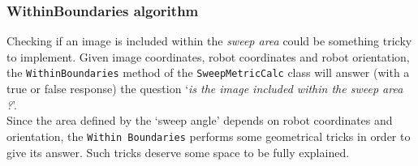 \subsubsection{WithinBoundaries algorithm}
\label{concr:iimageselector:spacial_metric_algorithm:withinboundaries}

Checking if an image is included within the \textit{sweep area}
could be something tricky to implement. Given image coordinates, 
robot coordinates and robot orientation, the \texttt{WithinBoundaries} 
method of the \texttt{SweepMetricCalc} class 
will answer (with a true or false response) the question
`\textit{is the image included within the sweep area ?}'.
\\
Since the area defined by the `sweep angle' depends on robot 
coordinates and orientation, the \texttt{Within Boundaries}
performs some geometrical tricks in order to give its answer. 
Such tricks deserve some space to be fully explained.

